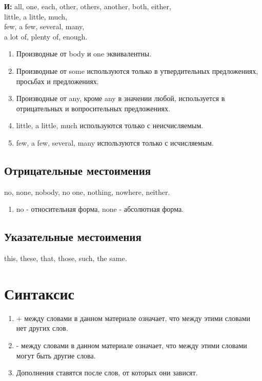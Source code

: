 \documentclass[oneside]{book}
\begin{document}
    \textbf{И:} all, one, each, other, others, another,
    both, either,
    \\
    little, a little, much,
    \\
    few, a few, several, many,
    \\
    a lot of, plenty of, enough.

    \begin{enumerate}
        \item Производные от body и one эквивалентны.

        \item Производные от some используются только в
        утвердительных предложениях, \\
        просьбах и предложениях.

        \item Производные от any, кроме any в значении
        любой, используется в отрицательных
        и вопросительных предложениях.

        \item little, a little, much используются только
        с неисчисляемым.

        \item few, a few, several, many используются
        только с исчисляемым.
    \end{enumerate}

    \section{Отрицательные местоимения}
    no, none, nobody, no one, nothing, nowhere,
    neither.

    \begin{enumerate}
        \item no - относительная форма,
        none - абсолютная форма.
    \end{enumerate}

    \section{Указательные местоимения}
    this, these, that, those, such, the same.

    \chapter{Синтаксис}
    \begin{enumerate}
        \item + между словами в данном материале означает,
        что между этими словами нет других слов.

        \item {}-{} между словами в данном материале означает,
        что между этими словами могут быть другие слова.

        \item Дополнения ставятся после слов, от которых они зависят.
    \end{enumerate}
\end{document}
